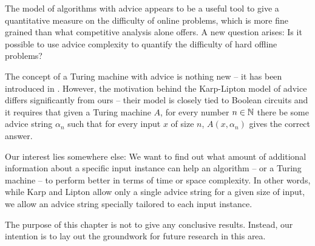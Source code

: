 The model of algorithms with advice appears to be a useful tool to give a
quantitative measure on the difficulty of online problems, which is more
fine grained than what competitive analysis alone offers. A new question
arises: Is it possible to use advice complexity to quantify the difficulty
of hard offline problems?

The concept of a Turing machine with advice is nothing new -- it has been
introduced in \cite{karp-advice}. However, the motivation behind the
Karp-Lipton model of advice differs significantly from ours -- their model
is closely tied to Boolean circuits and it requires that given a Turing
machine $A$, for every number $n \in \mathbb{N}$ there be some advice string
$\alpha_n$ such that for every input $x$ of size $n$, $A(x, \alpha_n)$
gives the correct answer.

Our interest lies somewhere else: We want to find out what amount of
additional information about a specific input instance can help an
algorithm -- or a Turing machine -- to perform better in terms of time or
space complexity. In other words, while Karp and Lipton allow only a
single advice string for a given size of input, we allow an advice string
specially tailored to each input instance.

The purpose of this chapter is not to give any conclusive results.
Instead, our intention is to lay out the groundwork for future research in
this area.
